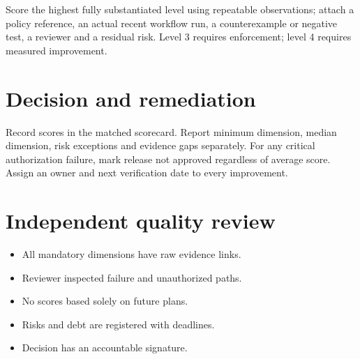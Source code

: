 \documentclass[11pt,letterpaper]{article}
\begin{document}
Score the highest fully substantiated level using repeatable observations; attach a policy reference, an actual recent workflow run, a counterexample or negative test, a reviewer and a residual risk. Level 3 requires enforcement; level 4 requires measured improvement.

\section{Decision and remediation}
Record scores in the matched scorecard. Report minimum dimension, median dimension, risk exceptions and evidence gaps separately. For any critical authorization failure, mark release not approved regardless of average score. Assign an owner and next verification date to every improvement.

\section{Independent quality review}
\begin{itemize}
\item All mandatory dimensions have raw evidence links.
\item Reviewer inspected failure and unauthorized paths.
\item No scores based solely on future plans.
\item Risks and debt are registered with deadlines.
\item Decision has an accountable signature.
\end{itemize}
\end{document}
